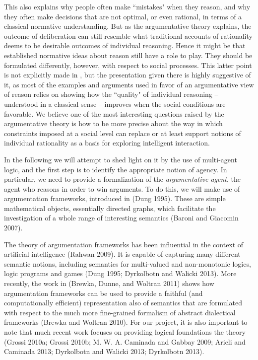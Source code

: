 \documentclass[greybox]{svmult}
\begin{document}
This also explains why people often make ``mistakes" when they reason, and why they often make decisions that are not optimal, or even rational, in terms of a classical normative understanding. But as the argumentative theory explains, the outcome of deliberation can still resemble what traditional accounts of rationality deems to be desirable outcomes of individual reasoning. Hence it might be that established normative ideas about reason still have a role to play. They should be formulated differently, however, with respect to social processes. This latter point is not explicitly made in \cite{whyreason}, but the presentation given there is highly suggestive of it, as most of the examples and arguments used in favor of an argumentative view of reason relies on showing how the ``quality" of individual reasoning -- understood in a classical sense -- improves when the social conditions are favorable. We believe one of the most interesting questions raised by the argumentative theory is how to be more precise about the way in which constraints imposed at a social level can replace or at least support notions of individual rationality as a basis for exploring intelligent interaction.

In the following we will attempt to shed light on it by the use of multi-agent logic, and the first step is to identify the appropriate notion of agency. In particular, we need to provide a formalization of the \emph{argumentative agent}, the agent who reasons in order to win arguments. To do this, we will make use of argumentation frameworks, introduced in (Dung 1995). These are simple mathematical objects, essentially directed graphs, which facilitate the investigation of a whole range of interesting semantics (Baroni and Giacomin 2007). 

The theory of argumentation frameworks has been influential in the context of artificial intelligence (Rahwan 2009). It is capable of capturing many different semantic notions, including semantics for multi-valued and non-monotonic logics, logic programs and games (Dung 1995; Dyrkolbotn and Walicki 2013). More recently, the work in (Brewka, Dunne, and Woltran 2011) shows how argumentation frameworks can be used to provide a faithful (and computationally efficient) representation also of semantics that are formulated with respect to the much more fine-grained formalism of abstract dialectical frameworks (Brewka and Woltran 2010). For our project, it is also important to note that much recent work focuses on providing logical foundations the theory (Grossi 2010a; Grossi 2010b; M. W. A. Caminada and Gabbay 2009; Arieli and Caminada 2013; Dyrkolbotn and Walicki 2013; Dyrkolbotn 2013).
\end{document}
